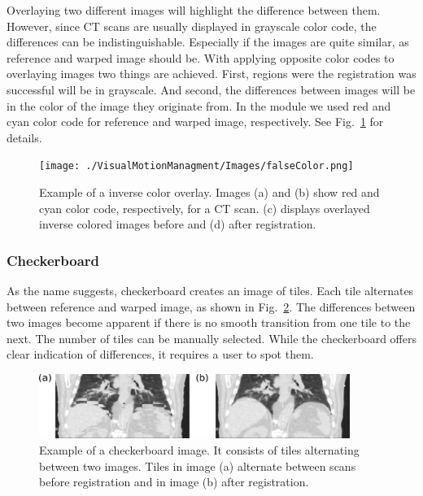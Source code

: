 Overlaying two different images will highlight the difference between them. However, since CT scans are usually displayed in grayscale color code, the differences can be indistinguishable. Especially if the images are quite similar, as reference and warped image should be. With applying opposite color codes to overlaying images two things are achieved. First, regions were the registration was successful will be in grayscale. And second, the differences between images will be in the color of the image they originate from. In the module we used red and cyan color code for reference and warped image, respectively. See Fig.~\ref{falseColor} for details.

\newpage
\begin{figure}[H]
	\begin{center}		
		\texttt{[image: ./VisualMotionManagment/Images/falseColor.png]}
		\caption{Example of a inverse color overlay. Images (a) and (b) show red and cyan color code, respectively, for a CT scan. (c) displays overlayed inverse colored images before and (d) after registration.}
		\label{falseColor}
	\end{center}
\end{figure}

\subsubsection{Checkerboard}

As the name suggests, checkerboard creates an image of tiles. Each tile alternates between reference and warped image, as shown in Fig.~\ref{checkerboard}. The differences between two images become apparent if there is no smooth transition from one tile to the next. The number of tiles can be manually selected. While the checkerboard offers clear indication of differences, it requires a user to spot them.

\begin{figure}[H]
	\begin{center}		
		\includegraphics[width=0.9\textwidth]{./VisualMotionManagment/Images/checkerboard.png}
		\caption{Example of a checkerboard image. It consists of tiles alternating between two images. Tiles in image (a) alternate between scans before registration and in image (b) after registration.}
		\label{checkerboard}
	\end{center}
\end{figure}

